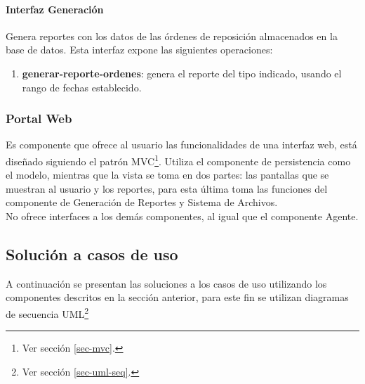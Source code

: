 \paragraph{Interfaz Generación\\} Genera reportes con los datos de las órdenes de reposición almacenados en la base de datos. Esta interfaz expone las siguientes operaciones:
\begin{enumerate}
	\item \textbf{generar-reporte-ordenes}: genera el reporte del tipo indicado, usando el rango de fechas establecido.
\end{enumerate}

\subsubsection{Portal Web}
Es componente que ofrece al usuario las funcionalidades de una interfaz web, está diseñado siguiendo el patrón MVC\footnote{Ver sección \ref{sec-mvc}.}. Utiliza el componente de persistencia como el modelo, mientras que la vista se toma en dos partes: las pantallas que se muestran al usuario y los reportes, para esta última toma las funciones del componente de Generación de Reportes y Sistema de Archivos.\\
No ofrece interfaces a los demás componentes, al igual que el componente Agente.



\subsection{Solución a casos de uso}
A continuación se presentan las soluciones a los casos de uso utilizando los componentes descritos en la sección anterior, para este fin se utilizan diagramas de secuencia UML\footnote{Ver sección \ref{sec-uml-seq}.}

